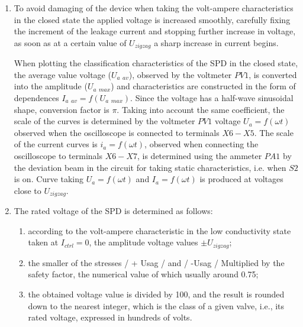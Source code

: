 \documentclass[a4paper,14pt]{article}
\begin{document}
\begin{enumerate}
Differential resistance and threshold voltage are determined by the dynamic current-voltage
characterization of open-loop SPD by approximation by its broken line, consisting of
a horizontal segment and an inclined beam crossing the characteristic at points $0.5 I_{m\:\: nom}$ and 
$1.5 I_{m\:\: nom}$,
where $I_{m\:\: nom} = 6\: A$ is the amplitude of the rated current STP.

\item To avoid damaging of the device when taking the volt-ampere characteristics in the closed state
the applied voltage is increased smoothly, carefully fixing the increment of the leakage current and stopping
further increase in voltage, as soon as at a certain value of $U_{zigzag}$
a sharp increase in current begins.

When plotting the classification characteristics of the SPD in the closed state, the average value
voltage ($U_{a\:\:av}$), observed by the voltmeter $PV1$, is converted into the amplitude ($U_{a\:\: max}$)
 and characteristics
are constructed in the form of dependences $I_{a\:\:av} = f(U_{a\:\:max})$. 
Since the voltage has a half-wave sinusoidal shape,
conversion factor is $\pi$. Taking into account the same coefficient, 
the scale of the curves is determined by the voltmeter $PV1$
voltage $U_a = f (\omega t)$ observed when the oscilloscope is connected to terminals $X6-X5$. 
The scale of the current curves is $i_a = f (\omega t)$,
observed when connecting the oscilloscope to terminals $X6-X7$, is determined using the ammeter $PA1$ by the deviation
beam in the circuit for taking static characteristics, i.e. when $S2$ is on. Curve taking $U_a = f (\omega t)$ and
$I_a = f (\omega t)$ is produced at voltages close to $U_{zigzag}$.

\item The rated voltage of the SPD is determined as follows:

\begin{enumerate}
\item according to the volt-ampere characteristic in the low conductivity state taken at $I_{ctrl} = 0$, 
the amplitude voltage values $\pm U_{zigzag}$;

\item the smaller of the stresses / + Usag / and / -Usag / Multiplied by the safety factor, the numerical value of which
usually around 0.75;

\item the obtained voltage value is divided by 100, and the result is rounded down to the nearest
integer, which is the class of a given valve, i.e., its rated voltage, expressed
in hundreds of volts.
\end{enumerate}


\end{enumerate}
\end{document}
